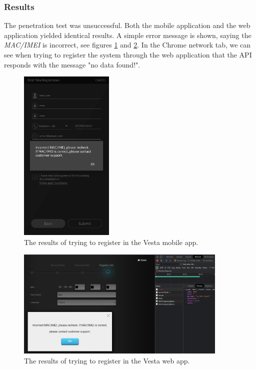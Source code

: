 \subsubsection{Results}
The penetration test was unsuccessful. Both the mobile application and the web application yielded identical results. A simple error message is shown, saying the \textit{MAC/IMEI} is incorrect, see figures \ref{fig:vesta-home-registration-failed} and \ref{fig:vesta-web-registration-failed}. In the Chrome network tab, we can see when trying to register the system through the web application that the API responds with the message "no data found!".
\begin{figure}[!ht]
    \centering
    \includegraphics[width=0.4\textwidth]{images/6-pentesting/vesta-home-registration-failed.jpg}
    \caption{The results of trying to register in the Vesta mobile app.}
    \label{fig:vesta-home-registration-failed}
\end{figure}
\begin{figure}[!ht]
    \centering
    \includegraphics[width=0.9\textwidth]{images/6-pentesting/vesta-web-registration-failed.png}
    \caption{The results of trying to register in the Vesta web app.}
    \label{fig:vesta-web-registration-failed}
\end{figure}

